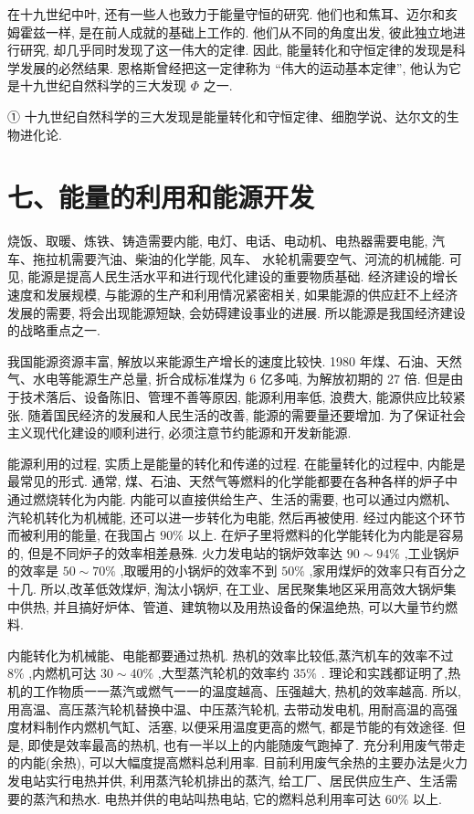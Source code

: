 \documentclass[10pt]{article}
\begin{document}
在十九世纪中叶, 还有一些人也致力于能量守恒的研究. 他们也和焦耳、迈尔和亥姆霍兹一样, 是在前人成就的基础上工作的. 他们从不同的角度出发, 彼此独立地进行研究, 却几乎同时发现了这一伟大的定律. 因此, 能量转化和守恒定律的发现是科学发展的必然结果. 恩格斯曾经把这一定律称为 “伟大的运动基本定律”, 他认为它是十九世纪自然科学的三大发现 \(\Phi\) 之一.

① 十九世纪自然科学的三大发现是能量转化和守恒定律、细胞学说、达尔文的生物进化论.

\section*{七、能量的利用和能源开发}

烧饭、取暖、炼铁、铸造需要内能, 电灯、电话、电动机、电热器需要电能, 汽车、拖拉机需要汽油、柴油的化学能, 风车、 水轮机需要空气、河流的机械能. 可见, 能源是提高人民生活水平和进行现代化建设的重要物质基础. 经济建设的增长速度和发展规模, 与能源的生产和利用情况紧密相关, 如果能源的供应赶不上经济发展的需要, 将会出现能源短缺, 会妨碍建设事业的进展. 所以能源是我国经济建设的战略重点之一.

我国能源资源丰富, 解放以来能源生产增长的速度比较快. 1980 年煤、石油、天然气、水电等能源生产总量, 折合成标准煤为 6 亿多吨, 为解放初期的 27 倍. 但是由于技术落后、设备陈旧、管理不善等原因, 能源利用率低, 浪费大, 能源供应比较紧张. 随着国民经济的发展和人民生活的改善, 能源的需要量还要增加. 为了保证社会主义现代化建设的顺利进行, 必须注意节约能源和开发新能源.

能源利用的过程, 实质上是能量的转化和传递的过程. 在能量转化的过程中, 内能是最常见的形式. 通常, 煤、石油、天然气等燃料的化学能都要在各种各样的炉子中通过燃烧转化为内能. 内能可以直接供给生产、生活的需要, 也可以通过内燃机、汽轮机转化为机械能, 还可以进一步转化为电能, 然后再被使用. 经过内能这个环节而被利用的能量, 在我国占 \({90}\%\) 以上. 在炉子里将燃料的化学能转化为内能是容易的, 但是不同炉子的效率相差悬殊. 火力发电站的锅炉效率达 \({90} \sim {94}\%\) ,工业锅炉的效率是 \({50} \sim {70}\%\) ,取暖用的小锅炉的效率不到 \({50}\%\) ,家用煤炉的效率只有百分之十几. 所以,改革低效煤炉, 淘汰小锅炉, 在工业、居民聚集地区采用高效大锅炉集中供热, 并且搞好炉体、管道、建筑物以及用热设备的保温绝热, 可以大量节约燃料.

内能转化为机械能、电能都要通过热机. 热机的效率比较低,蒸汽机车的效率不过 \(8\%\) ,内燃机可达 \({30} \sim {40}\%\) ,大型蒸汽轮机的效率约 \({35}\%\) . 理论和实践都证明了,热机的工作物质一一蒸汽或燃气一一的温度越高、压强越大, 热机的效率越高. 所以, 用高温、高压蒸汽轮机替换中温、中压蒸汽轮机, 去带动发电机, 用耐高温的高强度材料制作内燃机气缸、活塞, 以便采用温度更高的燃气, 都是节能的有效途径. 但是, 即使是效率最高的热机, 也有一半以上的内能随废气跑掉了. 充分利用废气带走的内能(余热), 可以大幅度提高燃料总利用率. 目前利用废气余热的主要办法是火力发电站实行电热并供, 利用蒸汽轮机排出的蒸汽, 给工厂、居民供应生产、生活需要的蒸汽和热水. 电热并供的电站叫热电站, 它的燃料总利用率可达 \({60}\%\) 以上.
\end{document}

